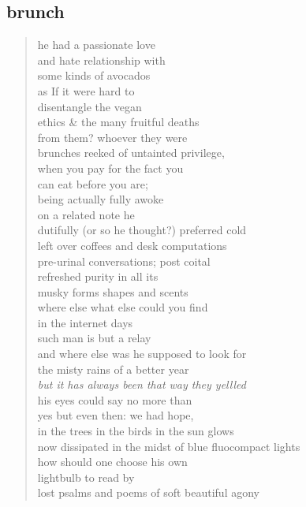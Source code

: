 \documentclass[11pt]{article}
\begin{document}
\subsection{brunch}
\label{sec:org85567d7}
\begin{verse}
he had a passionate love\\
and hate relationship with\\
some kinds of avocados\\
as If it were hard to\\
disentangle the vegan\\
ethics \& the many fruitful deaths\\
from them? whoever they were\\
brunches reeked of untainted privilege,\\
when you pay for the fact you\\
can eat before you are;\\
being actually fully awoke\\
\vspace*{1em}
on a related note he\\
dutifully (or so he thought?) preferred cold\\
left over coffees and desk computations\\
pre-urinal conversations; post coital\\
refreshed purity in all its\\
musky forms shapes and scents\\
where else what else could you find\\
in the internet days\\
such man is but a relay\\
and where else was he supposed to look for\\
the misty rains of a better year\\
\vspace*{1em}
\vspace*{1em}
\textit{but it has always been that way they yellled}\\
his eyes could say no more than\\
yes but even then: we had hope,\\
in the trees in the birds in the sun glows\\
now dissipated in the midst of blue fluocompact lights\\
how should one choose his own\\
lightbulb to read by\\
lost psalms and poems of soft beautiful agony\\
\end{verse}
\end{document}
